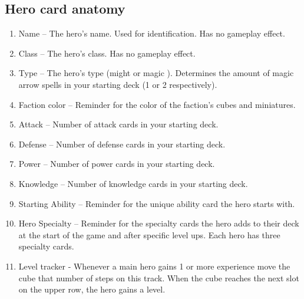\documentclass[12pt]{article}
\def\assets{assets}
\def\svgs{\assets/svgs}
\begin{document}
\subsection*{\hypertarget{Herocard}{Hero card anatomy}}
\begin{enumerate}
\item Name – The hero’s name. Used for identification. Has no gameplay effect.
\item Class – The hero’s class. Has no gameplay effect.
\item Type – The hero’s type (might  or magic ). Determines the amount of magic arrow spells in your starting deck (1 or 2 respectively).
\item Faction color – Reminder for the color of the faction’s cubes and miniatures.
\item Attack – Number of attack cards in your starting deck.
\item Defense – Number of defense cards in your starting deck.
\item Power – Number of power cards in your starting deck.
\item Knowledge – Number of knowledge cards in your starting deck.
\item Starting Ability – Reminder for the unique ability card the hero starts with.
\item Hero Specialty – Reminder for the specialty cards the hero adds to their deck at the start of the game and after specific level ups. Each hero has three specialty cards.
\item Level tracker - Whenever a main hero gains 1 or more experience  move the cube that number of steps on this track. When the cube reaches the next slot on the upper row, the hero gains a level.
\end{enumerate}
\clearpage
\end{document}
